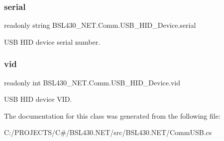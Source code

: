 \subsubsection{\texorpdfstring{serial}{serial}}
{\footnotesize\ttfamily readonly string B\+S\+L430\+\_\+\+N\+E\+T.\+Comm.\+U\+S\+B\+\_\+\+H\+I\+D\+\_\+\+Device.\+serial}



U\+SB H\+ID device serial number. 

\mbox{\label{class_b_s_l430___n_e_t_1_1_comm_1_1_u_s_b___h_i_d___device_adbd07bf1e5064d018465f25aea82c8ae}} 
\subsubsection{\texorpdfstring{vid}{vid}}
{\footnotesize\ttfamily readonly int B\+S\+L430\+\_\+\+N\+E\+T.\+Comm.\+U\+S\+B\+\_\+\+H\+I\+D\+\_\+\+Device.\+vid}



U\+SB H\+ID device V\+ID. 



The documentation for this class was generated from the following file\+:\begin{DoxyCompactItemize}
\item 
C\+:/\+P\+R\+O\+J\+E\+C\+T\+S/\+C\#/\+B\+S\+L430.\+N\+E\+T/src/\+B\+S\+L430.\+N\+E\+T/Comm\+U\+S\+B.\+cs\end{DoxyCompactItemize}
